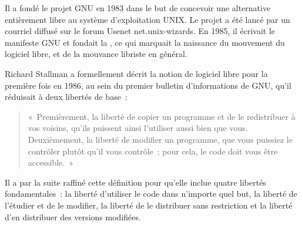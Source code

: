 Il a fondé le projet GNU en 1983 dans le but de concevoir une alternative entièrement libre au système d'exploitation UNIX. Le projet a été lancé par un courriel diffusé sur le forum Usenet net.unix-wizards. En 1985, il écrivait le manifeste GNU et fondait la , ce qui marquait la naissance du mouvement du logiciel libre, et de la mouvance libriste en général.

Richard Stallman a formellement décrit la notion de logiciel libre pour la première fois en 1986, au sein du premier bulletin d'informations de GNU, qu'il réduisait à deux libertés de base~:

\begin{quote}
«~Premièrement, la liberté de copier un programme et de le redistribuer à vos voisins, qu'ils puissent ainsi l'utiliser aussi bien que vous. Deuxièmement, la liberté de modifier un programme, que vous puissiez le contrôler plutôt qu'il vous contrôle~; pour cela, le code doit vous être accessible.~»
\end{quote} %

Il a par la suite raffiné cette définition pour qu'elle inclue quatre libertés fondamentales~: la liberté d'utiliser le code dans n'importe quel but, la liberté de l'étudier et de le modifier, la liberté de le distribuer sans restriction et la liberté d'en distribuer des versions modifiées.

